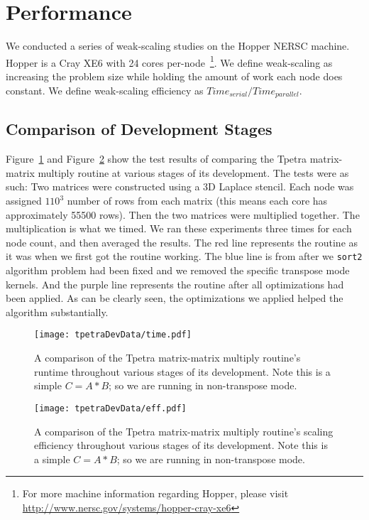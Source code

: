 \documentclass[pdf,12pt, strict]{SANDreport}
\begin{document}
\section{Performance}
\label{perfSect}
We conducted a series of weak-scaling studies on the Hopper NERSC machine. Hopper is a Cray XE6 with 24 cores
per-node~\footnote{For more machine information regarding Hopper, please visit \url{http://www.nersc.gov/systems/hopper-cray-xe6}}.
We define weak-scaling as increasing the problem size while holding the amount of work each node does constant. We define
weak-scaling efficiency as $Time_{serial}/Time_{parallel}$.

\subsection{Comparison of Development Stages}
Figure~\ref{tpetracomptime} and Figure~\ref{tpetracompeff} show the test results of comparing the Tpetra matrix-matrix multiply 
routine at various stages of its 
development.  The tests were as such: Two matrices were constructed using a 3D Laplace stencil. Each node was assigned 
$110^3$ number of rows from each matrix (this means each core has approximately 55500 rows). 
Then the two matrices were multiplied together. The multiplication is what 
we timed. We ran these experiments three times for each node count, and then averaged the results.
The red line represents the routine as it was when we first got the routine working. The blue line is from after 
we \verb!sort2! algorithm problem had been fixed and we removed the specific transpose mode kernels. 
And the purple line represents the routine after all optimizations had been applied.
As can be clearly seen, the optimizations we applied helped the algorithm substantially.

\begin{figure}
\centering
\texttt{[image: tpetraDevData/time.pdf]}
\caption[Tpetra Development Time Comparison]{A comparison of the Tpetra matrix-matrix multiply routine's runtime 
throughout various stages of its development. Note this is a simple $C=A*B$; so we are running in non-transpose mode.}
\label{tpetracomptime}
\end{figure}

\begin{figure}
\centering
\texttt{[image: tpetraDevData/eff.pdf]}
\caption[Tpetra Development Efficiency Comparison]{A comparison of the Tpetra matrix-matrix multiply routine's scaling efficiency
throughout various stages of its development. Note this is a simple $C=A*B$; so we are running in non-transpose mode.}
\label{tpetracompeff}
\end{figure}
\end{document}
